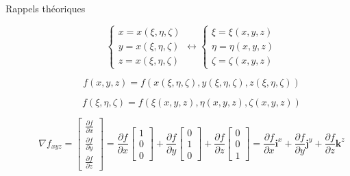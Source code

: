 \documentclass
[
a4paper,                      %
twoside,					  %
12pt,                         %
abstract,		      %
fleqn,                        %
]
{scrartcl} %
\begin{document}
\begin{description}
\item[Rappels th\'eoriques]

\begin{equation}
\begin{cases}
x=x\left(\xi,\eta,\zeta\right)\\
y=x\left(\xi,\eta,\zeta\right)\\
z=x\left(\xi,\eta,\zeta\right)
\end{cases}\longleftrightarrow\begin{cases}
\xi=\xi\left(x,y,z\right)\\
\eta=\eta\left(x,y,z\right)\\
\zeta=\zeta\left(x,y,z\right)
\end{cases}
\end{equation}

\begin{equation}
f\left(x,y,z\right)=f\left(x\left(\xi,\eta,\zeta\right),y\left(\xi,\eta,\zeta\right),z\left(\xi,\eta,\zeta\right)\right)
\end{equation}

\begin{equation}
f\left(\xi,\eta,\zeta\right)=f\left(\xi\left(x,y,z\right),\eta\left(x,y,z\right),\zeta\left(x,y,z\right)\right)
\end{equation}

\begin{equation}
\nabla f_{xyz}=\begin{bmatrix}
\frac{\partial f}{\partial x}\\[5pt]
\frac{\partial f}{\partial y}\\[5pt]
\frac{\partial f}{\partial z}
\end{bmatrix}=\frac{\partial f}{\partial x}\begin{bmatrix}
1\\[5pt]
0\\[5pt]
0
\end{bmatrix}+\frac{\partial f}{\partial y}\begin{bmatrix}
0\\[5pt]
1\\[5pt]
0
\end{bmatrix}+\frac{\partial f}{\partial z}\begin{bmatrix}
0\\[5pt]
0\\[5pt]
1
\end{bmatrix}=\frac{\partial f}{\partial x}\mathbf{i}^{x}+\frac{\partial f}{\partial y}\mathbf{j}^{y}+\frac{\partial f}{\partial z}\mathbf{k}^{z}
\end{equation}


\end{description}
\end{document}
